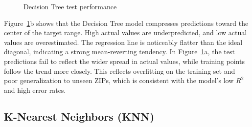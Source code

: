\begin{figure}[!ht]
    \centering
    \hfill
    \caption{Decision Tree test performance}
    \caption*{\hspace{1em}}
    \label{fig:dt_results}
\end{figure}
\FloatBarrier

Figure~\ref{fig:dt_results}b shows that the Decision Tree model compresses predictions toward the center of the target range. High actual values are underpredicted, and low actual values are overestimated. The regression line is noticeably flatter than the ideal diagonal, indicating a strong mean-reverting tendency. In Figure~\ref{fig:dt_results}a, the test predictions fail to reflect the wider spread in actual values, while training points follow the trend more closely. This reflects overfitting on the training set and poor generalization to unseen ZIPs, which is consistent with the model's low $R^2$ and high error rates.

\subsection{K-Nearest Neighbors (KNN)}

